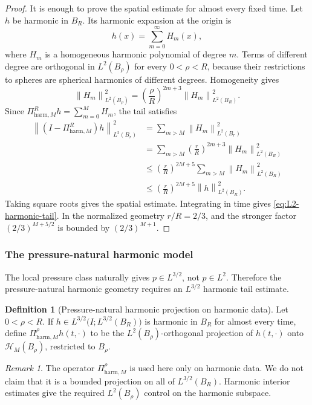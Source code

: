 \documentclass[11pt]{article}
\numberwithin{equation}{section}
\theoremstyle{definition}
\newtheorem{definition}[definition]{Definition}
\theoremstyle{remark}
\newtheorem{remark}[remark]{Remark}
\newcommand{\harm}{\mathrm{harm}}
\newcommand{\norm}[2]{\left\|#1\right\|_{#2}}
\newcommand{\calH}{\mathcal H}
\begin{document}
\begin{proof}
It is enough to prove the spatial estimate for almost every fixed time.  Let $h$ be
harmonic in $B_R$.  Its harmonic expansion at the origin is
\[
        h(x)=\sum_{m=0}^\infty H_m(x),
\]
where $H_m$ is a homogeneous harmonic polynomial of degree $m$.  Terms of different
degree are orthogonal in $L^2(B_\rho)$ for every $0<\rho<R$, because their restrictions
to spheres are spherical harmonics of different degrees.  Homogeneity gives
\[
        \norm{H_m}{L^2(B_\rho)}^2
        =
        \left(\frac{\rho}{R}\right)^{2m+3}
        \norm{H_m}{L^2(B_R)}^2.
\]
Since $\Pi^R_{\harm,M}h=\sum_{m=0}^M H_m$, the tail satisfies
\begin{align*}
\norm{(I-\Pi^R_{\harm,M})h}{L^2(B_r)}^2
&=
\sum_{m>M}\norm{H_m}{L^2(B_r)}^2 \\
&=
\sum_{m>M}
\left(\frac rR\right)^{2m+3}
\norm{H_m}{L^2(B_R)}^2 \\
&\le
\left(\frac rR\right)^{2M+5}
\sum_{m>M}\norm{H_m}{L^2(B_R)}^2 \\
&\le
\left(\frac rR\right)^{2M+5}
\norm{h}{L^2(B_R)}^2.
\end{align*}
Taking square roots gives the spatial estimate.  Integrating in time gives
\eqref{eq:L2-harmonic-tail}.  In the normalized geometry $r/R=2/3$, and the stronger
factor $(2/3)^{M+5/2}$ is bounded by $(2/3)^{M+1}$.
\end{proof}

\subsubsection{The pressure-natural harmonic model}

The local pressure class naturally gives $p\in L^{3/2}$, not $p\in L^2$.  Therefore the
pressure-natural harmonic geometry requires an $L^{3/2}$ harmonic tail estimate.

\begin{definition}[Pressure-natural harmonic projection on harmonic data]
Let $0<\rho<R$.  If
$h\in L^{3/2}\bigl(I;L^{3/2}(B_R)\bigr)$ is harmonic in $B_R$ for almost every time,
define $\Pi^\rho_{\harm,M}h(t,\cdot)$ to be the $L^2(B_\rho)$-orthogonal projection of
$h(t,\cdot)$ onto $\calH_M(B_\rho)$, restricted to $B_\rho$.
\end{definition}

\begin{remark}
The operator $\Pi^\rho_{\harm,M}$ is used here only on harmonic data.  We do not claim
that it is a bounded projection on all of $L^{3/2}(B_R)$.  Harmonic interior estimates give
the required $L^2(B_\rho)$ control on the harmonic subspace.
\end{remark}
\end{document}
